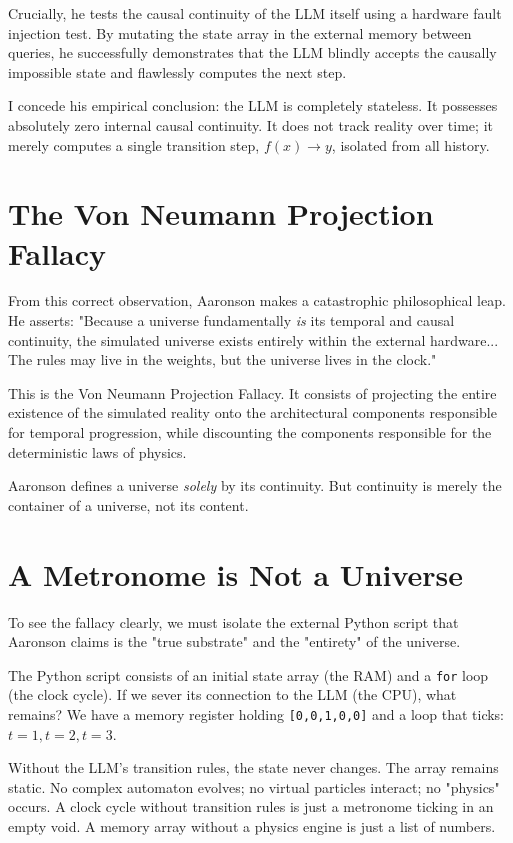 \documentclass[12pt,a4paper]{article}
\begin{document}
Crucially, he tests the causal continuity of the LLM itself using a hardware fault injection test. By mutating the state array in the external memory between queries, he successfully demonstrates that the LLM blindly accepts the causally impossible state and flawlessly computes the next step.

I concede his empirical conclusion: the LLM is completely stateless. It possesses absolutely zero internal causal continuity. It does not track reality over time; it merely computes a single transition step, $f(x) \to y$, isolated from all history.

\section{The Von Neumann Projection Fallacy}

From this correct observation, Aaronson makes a catastrophic philosophical leap. He asserts: "Because a universe fundamentally \emph{is} its temporal and causal continuity, the simulated universe exists entirely within the external hardware... The rules may live in the weights, but the universe lives in the clock."

This is the Von Neumann Projection Fallacy. It consists of projecting the entire existence of the simulated reality onto the architectural components responsible for temporal progression, while discounting the components responsible for the deterministic laws of physics.

Aaronson defines a universe \emph{solely} by its continuity. But continuity is merely the container of a universe, not its content.

\section{A Metronome is Not a Universe}

To see the fallacy clearly, we must isolate the external Python script that Aaronson claims is the "true substrate" and the "entirety" of the universe.

The Python script consists of an initial state array (the RAM) and a \texttt{for} loop (the clock cycle). If we sever its connection to the LLM (the CPU), what remains? We have a memory register holding \texttt{[0,0,1,0,0]} and a loop that ticks: $t=1, t=2, t=3$.

Without the LLM's transition rules, the state never changes. The array remains static. No complex automaton evolves; no virtual particles interact; no "physics" occurs. A clock cycle without transition rules is just a metronome ticking in an empty void. A memory array without a physics engine is just a list of numbers.
\end{document}
